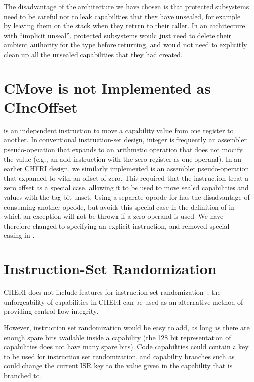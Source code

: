 The disadvantage of the architecture we have chosen is that protected subsystems
need to be careful not to leak capabilities that they have unsealed, for example
by leaving them on the stack when they return to their caller. In an
architecture with ``implicit unseal'', protected subsystems would just need
to delete their ambient authority for the type before returning, and would
not need to explicitly clean up all the unsealed capabilities that they
had created.

\section{CMove is not Implemented as CIncOffset}

 is an independent instruction to move a capability value
from one register to another.
In conventional instruction-set design, integer  is
frequently an assembler pseudo-operation that expands to an arithmetic
operation that does not modify the value (e.g., an add instruction with the
zero register as one operand).
In an earlier CHERI design, we similarly implemented  is an
assembler pseudo-operation that expanded to  with an
offset of zero.
This required that the  instruction treat a zero
offset as a special case, allowing it to be used to move sealed capabilities
and values with the tag bit unset.
Using a separate opcode for  has the disadvantage of
consuming another opcode, but avoids this special case in the definition of
 in which an exception will not be thrown if a zero
operand is used.
We have therefore changed to specifying an explicit 
instruction, and removed special casing in .

\section{Instruction-Set Randomization}

CHERI does not include features for instruction set
randomization~\cite{Keromytis2003};
the unforgeability of capabilities in CHERI can be used as an alternative
method of providing control flow integrity.

However, instruction set randomization would be easy to add, as long as
there are enough spare bits available inside a capability (the 128 bit
representation of capabilities does not have many spare bits). Code
capabilities could contain a key to be used for instruction set
randomization, and capability branches such as  could
change the current ISR key to the value given in the capability that is
branched to.


